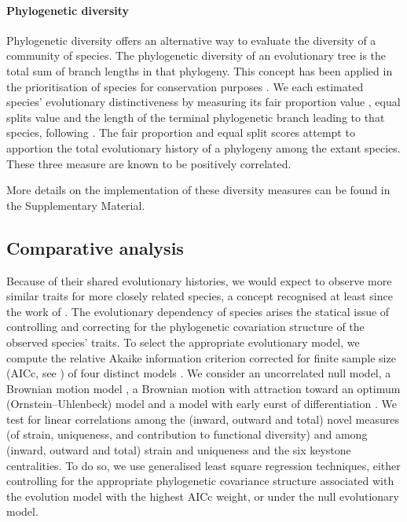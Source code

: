 \documentclass[12pt]{article}
\begin{document}
\paragraph{Phylogenetic diversity}
Phylogenetic diversity \citep{hartmann2007phylogenetic} offers an alternative
way to evaluate the diversity of a community of species. The phylogenetic
diversity of an evolutionary tree is the total sum of branch lengths in that
phylogeny. This concept has been applied in the prioritisation of species
for conservation purposes \citep{faith1992conservation,mace2003preserving}.  We
each estimated species' evolutionary distinctiveness by
measuring its fair proportion value \citep{isaac2007mammals}, equal
splits value \citep{redding2006incorporating} and the length of the terminal
phylogenetic branch leading to that species, following \citet{faye2015valuing}.
The fair proportion and equal split scores attempt to apportion the total
evolutionary  history of a phylogeny among the extant species. These three
measure are known to be positively correlated.

More details on the implementation of these diversity measures can be found in the Supplementary
Material.

\subsection{Comparative analysis}
Because of their shared evolutionary histories, we would expect to observe more similar
traits for more closely related species, a concept recognised at least
since the work of \citet{felsenstein1985phylogenies}.  The evolutionary
dependency of species arises the statical issue of controlling and correcting
for the phylogenetic covariation structure of the observed species' traits.
To select the appropriate evolutionary model, we compute the relative Akaike information criterion
corrected for finite sample size (AICc, see \citet{hurvich1989regression})
of four distinct models \citep{garamszegi2014multimodel}. We
consider an uncorrelated null model, a Brownian motion model
\citep{felsenstein1985phylogenies}, a Brownian motion with attraction toward an
optimum (Ornstein--Uhlenbeck) model \citep{hansen1997stabilizing} and a model with early
eurst of differentiation \citep{harmon2010early}.
We test for linear correlations among the (inward, outward and total) novel measures (of strain,
uniqueness, and contribution to functional diversity) and among (inward, outward and total)
strain and uniqueness and the six keystone centralities. To do so, we use generalised
least square regression techniques, either controlling for the appropriate
phylogenetic covariance structure associated with the evolution model with the highest
AICc weight, or under the null evolutionary model.
\end{document}
